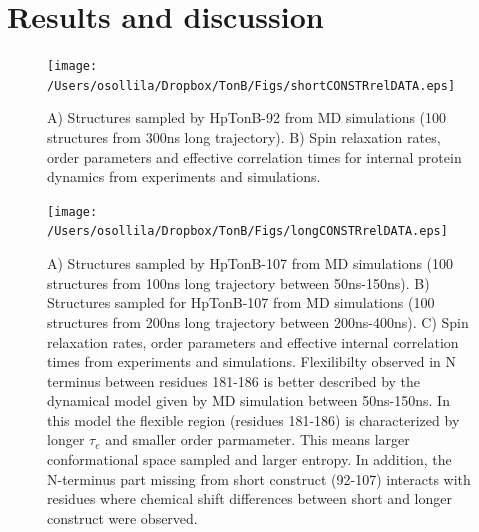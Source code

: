 \documentclass[pre,aps,floatfix,authordate1-4]{revtex4-1}
\begin{document}
\section{Results and discussion}

\begin{figure}[!p]
  \texttt{[image: /Users/osollila/Dropbox/TonB/Figs/shortCONSTRrelDATA.eps]}%
  \caption{A) Structures sampled by HpTonB-92 from MD simulations
    (100 structures from 300ns long trajectory).
    B) Spin relaxation rates, order parameters and effective correlation times for
    internal protein dynamics from experiments and simulations. 
    \label{HpTonB92}}%
\end{figure}

\begin{figure}[!p]
  \texttt{[image: /Users/osollila/Dropbox/TonB/Figs/longCONSTRrelDATA.eps]}%
  \caption{A) Structures sampled by HpTonB-107 from MD simulations
    (100 structures from 100ns long trajectory between 50ns-150ns).
    B) Structures sampled for HpTonB-107 from MD simulations
    (100 structures from 200ns long trajectory between 200ns-400ns).
    C) Spin relaxation rates, order parameters and effective internal correlation
    times from experiments and simulations.
    Flexilibilty observed in N terminus between residues 181-186
    is better described by the dynamical model given by MD simulation between 50ns-150ns.
    In this model the flexible region (residues 181-186) is characterized by longer $\tau_e$
    and smaller order parmameter. This means larger conformational space sampled and larger
    entropy. In addition, the N-terminus part missing from short construct (92-107) interacts with
    residues where chemical shift differences between short and longer construct were observed.
    \label{HpTonB92}}%
\end{figure}
\end{document}

